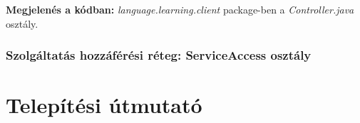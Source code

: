 \documentclass[11pt, a4paper]{article}
\begin{document}
     \textbf{Megjelenés a kódban:} \textit{language.learning.client} package-ben a \textit{Controller.java} osztály.
     
     \subsubsection{Szolgáltatás hozzáférési réteg: ServiceAccess osztály}
     
    \section{Telepítési útmutató}
    
    
\end{document}
